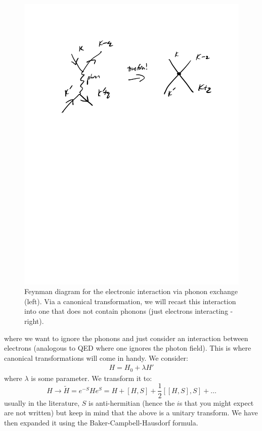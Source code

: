 \begin{figure}[htbp]
    \centering
    \includegraphics[scale=0.6]{Images/fig-electroninteractionfeynman.pdf}
    \caption{Feynman diagram for the electronic interaction via phonon exchange (left). Via a canonical transformation, we will recast this interaction into one that does not contain phonons (just electrons interacting - right).}
    \label{fig-electroninteractionfeynman}
\end{figure}

where we want to ignore the phonons and just consider an interaction between electrons (analogous to QED where one ignores the photon field). This is where canonical transformations will come in handy. We consider:
\begin{align*}
    H = H_0 + \lambda H'
\end{align*}
where $\lambda$ is some parameter. We transform it to:
\begin{equation}
    H \to \tilde{H} = e^{-S}He^{S} = H + [H, S] + \frac{1}{2}[[H, S], S] + \ldots
\end{equation}
usually in the literature, $S$ is anti-hermitian (hence the $i$s that you might expect are not written) but keep in mind that the above is a unitary transform. We have then expanded it using the Baker-Campbell-Hausdorf formula.

